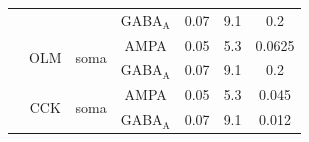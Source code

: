 \documentclass[../main.tex]{subfiles}
\begin{document}
\begin{table}[!htb]
\begin{center}
\begin{tabular}{|c|c|c|c|c|c|c|}
         &                            &                           & GABA$_\text{A}$ & 0.07 & 9.1 & 0.2    \\ \cline{2-7}
         & \multirow{2}{*}{OLM}       & \multirow{2}{*}{soma}     & AMPA            & 0.05 & 5.3 & 0.0625 \\ \cline{4-7}
         &                            &                           & GABA$_\text{A}$ & 0.07 & 9.1 & 0.2    \\ \cline{2-7}
         & \multirow{2}{*}{CCK}       & \multirow{2}{*}{soma}     & AMPA            & 0.05 & 5.3 & 0.045  \\ \cline{4-7}
         &                            &                           & GABA$_\text{A}$ & 0.07 & 9.1 & 0.012  \\ \hline
    \end{tabular}
    \label{table:background_activity}
\end{center}
\end{table}
\end{document}
